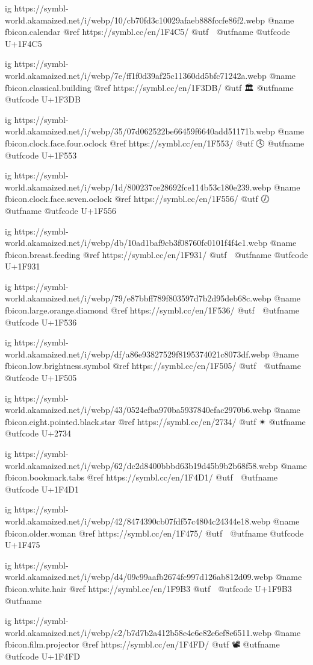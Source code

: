 	ig https://symbl-world.akamaized.net/i/webp/10/cb70fd3c10029afaeb888fccfe86f2.webp
	@name fbicon.calendar
	@ref https://symbl.cc/en/1F4C5/
	@utf 📅
	@utfname
	@utfcode U+1F4C5

	ig https://symbl-world.akamaized.net/i/webp/7e/ff1f0d39af25c11360dd5bfc71242a.webp
	@name fbicon.classical.building
	@ref https://symbl.cc/en/1F3DB/
	@utf 🏛
	@utfname
	@utfcode U+1F3DB

	ig https://symbl-world.akamaized.net/i/webp/35/07d062522be66459f6640add51171b.webp
	@name fbicon.clock.face.four.oclock
	@ref https://symbl.cc/en/1F553/
	@utf 🕓
	@utfname
	@utfcode U+1F553

	ig https://symbl-world.akamaized.net/i/webp/1d/800237ce28692fce114b53c180e239.webp
	@name fbicon.clock.face.seven.oclock
	@ref https://symbl.cc/en/1F556/
	@utf 🕖
	@utfname
	@utfcode U+1F556

	ig https://symbl-world.akamaized.net/i/webp/db/10ad1baf9cb3f08760fc0101f4f4e1.webp
	@name fbicon.breast.feeding
	@ref https://symbl.cc/en/1F931/
	@utf 🤱
	@utfname
	@utfcode U+1F931

	ig https://symbl-world.akamaized.net/i/webp/79/e87bbff789f803597d7b2d95deb68c.webp
	@name fbicon.large.orange.diamond
	@ref https://symbl.cc/en/1F536/
	@utf 🔶
	@utfname
	@utfcode U+1F536

	ig https://symbl-world.akamaized.net/i/webp/df/a86e93827529f8195374021c8073df.webp
	@name fbicon.low.brightness.symbol
	@ref https://symbl.cc/en/1F505/
	@utf 🔅
	@utfname
	@utfcode U+1F505

	ig https://symbl-world.akamaized.net/i/webp/43/0524efba970ba5937840efac2970b6.webp
	@name fbicon.eight.pointed.black.star
	@ref https://symbl.cc/en/2734/
	@utf ✴
	@utfname
	@utfcode U+2734

	ig https://symbl-world.akamaized.net/i/webp/62/dc2d8400bbbd63b19d45b9b2b68f58.webp
	@name fbicon.bookmark.tabs
	@ref https://symbl.cc/en/1F4D1/
	@utf 📑
	@utfname
	@utfcode U+1F4D1

	ig https://symbl-world.akamaized.net/i/webp/42/8474390cb07fdf57c4804c24344e18.webp
	@name fbicon.older.woman
	@ref https://symbl.cc/en/1F475/
	@utf 👵
	@utfname
	@utfcode U+1F475

	ig https://symbl-world.akamaized.net/i/webp/d4/09c99aafb2674fc997d126ab812d09.webp
	@name fbicon.white.hair
	@ref https://symbl.cc/en/1F9B3
	@utf 🦳
	@utfcode U+1F9B3
	@utfname

	ig https://symbl-world.akamaized.net/i/webp/c2/b7d7b2a412b58e4e6e82e6ef8e6511.webp
	@name fbicon.film.projector
	@ref https://symbl.cc/en/1F4FD/
	@utf 📽
	@utfname
	@utfcode U+1F4FD

